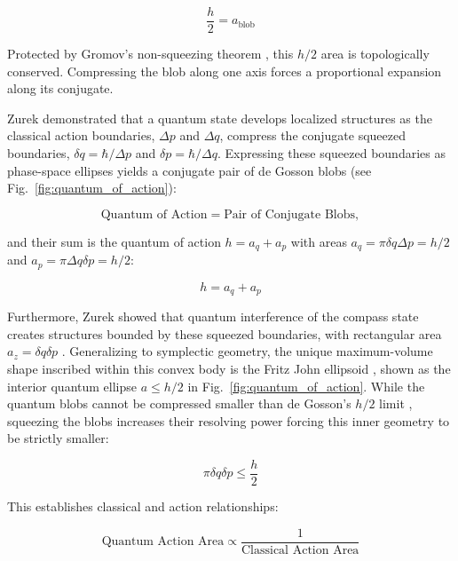 \documentclass[%
  aps, reprint, prl, amsmath,amssymb
]{revtex4-2}
\begin{document}
\begin{equation}
\label{eq:SymplecticCapacity}
\frac{h}{2} = a_{\text{blob}}
\end{equation}

Protected by Gromov's non-squeezing theorem \cite{Gromov1985}, this $h/2$ area is topologically conserved. Compressing the blob along one axis forces a proportional expansion along its conjugate.

Zurek \cite{Zurek2001} demonstrated that a quantum state develops localized structures as the classical action boundaries, $\Delta p$ and $\Delta q$, compress the conjugate squeezed boundaries, $\delta q = \hbar / \Delta p$ and $\delta p = \hbar / \Delta q$. Expressing these squeezed boundaries as phase-space ellipses yields a conjugate pair of de Gosson blobs (see Fig.~\ref{fig:quantum_of_action}):

\begin{equation}
\label{eq:SimpleLanguageBlobs}
\text{Quantum of Action} = \text{Pair of Conjugate Blobs},
\end{equation}

and their sum is the quantum of action $h=a_q+a_p$ with areas $a_q = \pi \delta q \Delta p = h/2$ and $a_p = \pi \Delta q \delta p = h/2$:

\begin{equation}
\label{eq:Blobs}
h = a_q + a_p
\end{equation}

Furthermore, Zurek showed that quantum interference of the compass state creates structures bounded by these squeezed boundaries, with rectangular area $a_z = \delta q \delta p$ \cite{Zurek2001}. Generalizing to symplectic geometry, the unique maximum-volume shape inscribed within this convex body is the Fritz John ellipsoid \cite{John1948}, shown as the interior quantum ellipse $a \le h/2$ in Fig.~\ref{fig:quantum_of_action}. While the quantum blobs cannot be compressed smaller than de Gosson's $h/2$ limit \cite{DeGosson2022}, squeezing the blobs increases their resolving power forcing this inner geometry to be strictly smaller:

\begin{equation}
\label{eq:JohnEllipsoid}
\pi \delta q \delta p \le \frac{h}{2}
\end{equation}

This establishes classical and action relationships:

\begin{equation}
\label{eq:GeometricUncertaintyPrinciplePlainLanguage}
\text{Quantum Action Area} \propto \frac{1}{\text{Classical Action Area}}
\end{equation}
\end{document}
